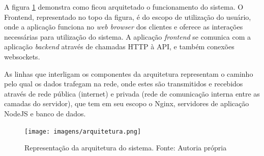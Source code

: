 A figura \ref{fig:architecture} demonstra como ficou arquitetado o funcionamento do sistema. O Frontend, representado no topo da figura, é do escopo de utilização do usuário, onde a aplicação funciona no \textit{web browser} dos clientes e oferece as interações necessárias para utilização do sistema. A aplicação \textit{frontend} se comunica com a aplicação \textit{backend} através de chamadas HTTP à API, e também conexões websockets.

As linhas que interligam os componentes da arquitetura representam o caminho pelo qual os dados trafegam na rede, onde estes são transmitidos e recebidos através de rede pública (internet) e privada (rede de comunicação interna entre as camadas do servidor), que tem em seu escopo o Nginx, servidores de aplicação NodeJS e banco de dados.

\begin{figure}[!htb]
	\centering
	\texttt{[image: imagens/arquitetura.png]}
	\caption{\small Representação da arquitetura do sistema. Fonte: Autoria própria}
	\label{fig:architecture}
\end{figure}
